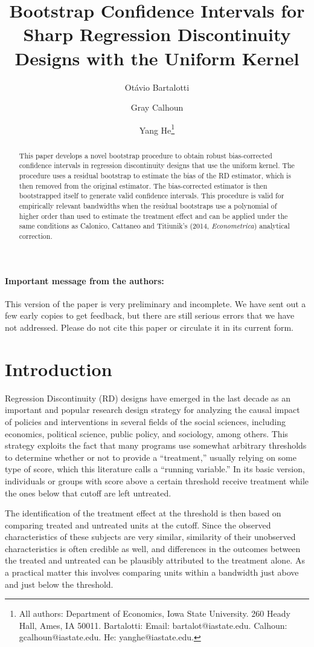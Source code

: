 \documentclass[12pt,fleqn]{article}
\title{Bootstrap Confidence Intervals for Sharp Regression Discontinuity Designs
  with the Uniform Kernel}
\author{Ot\'avio Bartalotti \and Gray Calhoun \and Yang He\thanks{All authors: 
Department of Economics, Iowa State University. 260 Heady Hall, Ames, IA  50011.
Bartalotti: Email: bartalot@iastate.edu. Calhoun: gcalhoun@iastate.edu.
He: yanghe@iastate.edu.}}
\begin{document}
\maketitle

\begin{abstract}\noindent
  This paper develops a novel bootstrap procedure to obtain robust
  bias-corrected confidence intervals in regression discontinuity designs that
  use the uniform kernel. The procedure uses a residual bootstrap to estimate
  the bias of the RD estimator, which is then removed from the original estimator.
 The bias-corrected estimator is then bootstrapped itself to
  generate valid confidence intervals. This procedure is valid for empirically
  relevant bandwidths when the residual bootstraps use a polynomial of higher
  order than used to estimate the treatment effect and can be applied under the
  same conditions as Calonico, Cattaneo and Titiunik's (2014,
  \textit{Econometrica}) analytical correction.
\end{abstract}

\paragraph{Important message from the authors:} This version of the paper is
very preliminary and incomplete. We have sent out a few early copies to get
feedback, but there are still serious errors that we have not addressed. Please
do not cite this paper or circulate it in its current form.

\newpage
\section{Introduction}
Regression Discontinuity (RD) designs have emerged in the last decade as an
important and popular research design strategy for analyzing the causal impact
of policies and interventions in several fields of the social sciences,
including economics, political science, public policy, and sociology, among
others. This strategy exploits the fact that many programs use somewhat
arbitrary thresholds to determine whether or not to provide a ``treatment,''
usually relying on some type of score, which this literature calls a ``running
variable.'' In its basic version, individuals or groups with score above a
certain threshold receive treatment while the ones below that cutoff are left
untreated.

The identification of the treatment effect at the threshold is then based on
comparing treated and untreated units at the cutoff. Since the observed
characteristics of these subjects are very similar, similarity of their
unobserved characteristics is often credible as well, and differences in the
outcomes between the treated and untreated can be plausibly attributed to the
treatment alone. As a practical matter this involves comparing units within a
bandwidth just above and just below the threshold.
\end{document}
